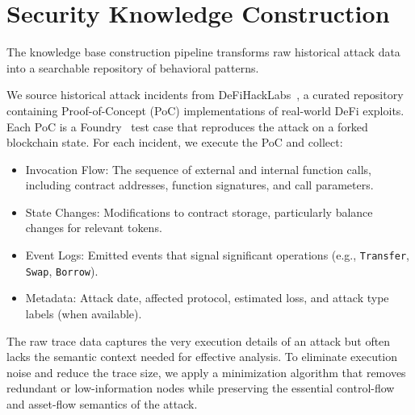 
\section{Security Knowledge Construction}
\label{sec:knowledge-base}

The knowledge base construction pipeline transforms raw historical attack data into a searchable repository of behavioral patterns. 


We source historical attack incidents from DeFiHackLabs~\cite{defihacklabs2024}, a curated repository containing Proof-of-Concept (PoC) implementations of real-world DeFi exploits.  Each PoC is a Foundry~\cite{foundry} test case that reproduces the attack on a forked blockchain state. For each incident, we execute the PoC and collect:

\begin{itemize}
    \item Invocation Flow: The sequence of external and internal function calls, including contract addresses, function signatures, and call parameters.
    \item State Changes: Modifications to contract storage, particularly balance changes for relevant tokens.
    \item Event Logs: Emitted events that signal significant operations (e.g., \texttt{Transfer}, \texttt{Swap}, \texttt{Borrow}).
    \item Metadata: Attack date, affected protocol, estimated loss, and attack type labels (when available).
\end{itemize}

The raw trace data captures the very execution details of an attack but often lacks the semantic context needed for effective analysis. 
To eliminate execution noise and reduce the trace size, we apply a minimization algorithm that removes redundant or low-information nodes while preserving the essential control-flow and asset-flow semantics of the attack.

